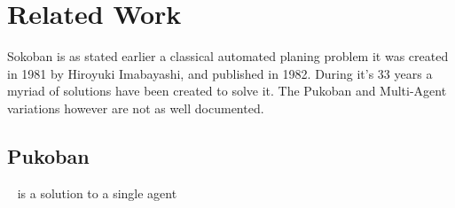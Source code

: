 \section{Related Work}
Sokoban is as stated earlier a classical automated planing problem it was created in 1981 by Hiroyuki Imabayashi, and published in 1982. During it's 33 years a myriad of solutions have been created to solve it.
The Pukoban and Multi-Agent variations however are not as well documented.
\subsection{Pukoban}
~\cite{Pukoban} is a solution to a single agent 